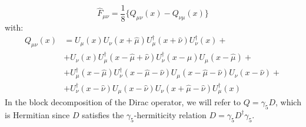 \begin{equation}
    \hat{F}_{\mu\nu} = \frac{1}{8} \{ Q_{\mu\nu}(x) - Q_{\nu\mu}(x)\}
\end{equation}
with:
\begin{equation}
    \begin{split}
        Q_{\mu\nu}(x) & = U_\mu(x) U_\nu(x + \hat{\mu}) U_\mu^\dagger(x + \hat{\nu}) U_\nu^\dagger(x) + \\
        & + U_\nu(x) U^\dagger_\mu(x - \hat{\mu} + \hat{\nu}) U_\nu^\dagger(x - \hat{\mu}) U_\mu(x - \hat{\mu}) + \\
        & +  U^\dagger_\mu(x - \hat{\mu}) U^\dagger_\nu(x - \hat{\mu} - \hat{\nu}) U_\mu(x - \hat{\mu} - \hat{\nu}) U_\nu(x - \hat{\nu}) + \\
        & +  U^\dagger_\nu(x - \hat{\nu}) U_\mu(x - \hat{\nu}) U_\nu(x + \hat{\mu} - \hat{\nu}) U^\dagger_\mu(x)
    \end{split}
\end{equation}
In the block decomposition of the Dirac operator, we will refer to $Q = \gamma_5 D$, which is Hermitian since $D$ satisfies the $\gamma_5$-hermiticity relation $D = \gamma_5 D^\dagger \gamma_5$.
